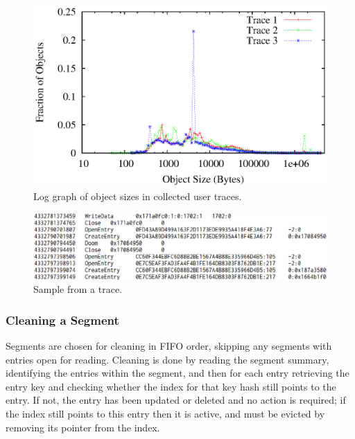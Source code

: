 \documentclass[letterpaper,twocolumn,10pt]{article}
\begin{document}
\begin{figure}[t]
  \begin{center}
    \includegraphics[width=1.04\columnwidth]{graphs/log-size-dist}
  \end{center}
  \caption{Log graph of object sizes in collected user traces.}
  \label{fig:log-size-dist} 
\vspace{-0.2in}
\end{figure}


\begin{figure}
  \begin{center}
    \includegraphics[width=\columnwidth]{graphs/trace}
  \end{center}
  \caption{Sample from a trace.}
  \label{fig:trace}
\vspace{-0.2in}
\end{figure}

\subsubsection{Cleaning a Segment}
Segments are chosen for cleaning in FIFO order, skipping any segments with
entries open for reading. Cleaning is done by reading the segment summary,
identifying the entries within the segment, and then for each entry retrieving
the entry key and checking whether the index for that key hash still points to
the entry. If not, the entry has been updated or deleted and no action is
required; if the index still points to this entry then it is active, and must be
evicted by removing its pointer from the index.
\end{document}
